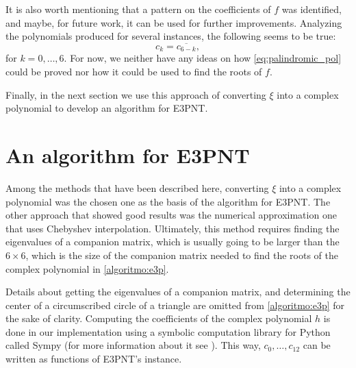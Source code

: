 It is also worth mentioning that a pattern on the coefficients of $f$ was identified, and maybe, for future work, it can be used for further improvements. Analyzing the polynomials produced for several instances, the following seems to be true:
\begin{equation}\label{eq:palindromic_pol}
c_k = \overline{c_{6-k}},
\end{equation}
for $k=0, \dots, 6$. For now, we neither have any ideas on how \autoref{eq:palindromic_pol} could be proved nor how it could be used to find the roots of $f$.

Finally, in the next section we use this approach of converting $\xi$ into a complex polynomial to develop an algorithm for E3PNT.

\section{An algorithm for E3PNT}

Among the methods that have been described here, converting $\xi$ into a complex polynomial was the chosen one as the basis of the algorithm for E3PNT.
The other approach that showed good results was the numerical approximation one that uses Chebyshev interpolation. Ultimately, this method requires finding the eigenvalues of a companion matrix, which is usually going to be larger than the $6\times 6$, which is the size of the companion matrix needed to find the roots of the complex polynomial in \autoref{algoritmo:e3p}. 

Details about getting the eigenvalues of a companion matrix, and determining the center of a circumscribed circle of a triangle are omitted from \autoref{algoritmo:e3p} for the sake of clarity. 
Computing the coefficients of the complex polynomial $h$ is done in our implementation using a symbolic computation library for Python called Sympy (for more information about it see ). This way, $c_0, \dots, c_{12}$ can be written as functions of E3PNT's instance.


